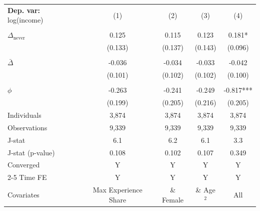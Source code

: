 \begin{tabular}{l cccc} \toprule  \textbf{Dep. var:}  log(income) 
                    &\multicolumn{1}{c}{(1)}   &\multicolumn{1}{c}{(2)}   &\multicolumn{1}{c}{(3)}   &\multicolumn{1}{c}{(4)}   \\
                    &               &               &               &               \\
\addlinespace
$\Delta_{\text{never}}$&       0.125   &       0.115   &       0.123   &       0.181*  \\
                    &     (0.133)   &     (0.137)   &     (0.143)   &     (0.096)   \\
                    &               &               &               &               \\
\addlinespace
$\bar{\Delta}$      &      -0.036   &      -0.034   &      -0.033   &      -0.042   \\
                    &     (0.101)   &     (0.102)   &     (0.102)   &     (0.100)   \\
                    &               &               &               &               \\
\addlinespace
$\phi$              &      -0.263   &      -0.241   &      -0.249   &      -0.817***\\
                    &     (0.199)   &     (0.205)   &     (0.216)   &     (0.205)   \\
\addlinespace
Individuals         &       3,874   &       3,874   &       3,874   &       3,874   \\
Observations        &       9,339   &       9,339   &       9,339   &       9,339   \\
J-stat              &         6.1   &         6.2   &         6.1   &         3.3   \\
J-stat (p-value)    &       0.108   &       0.102   &       0.107   &       0.349   \\
Converged           &           Y   &           Y   &           Y   &           Y   \\
\cmidrule{2-5} Time FE & Y & Y & Y & Y \\ Covariates & Max Experience Share & \& Female & \& Age$^2$ & All \\ \bottomrule \end{tabular}
